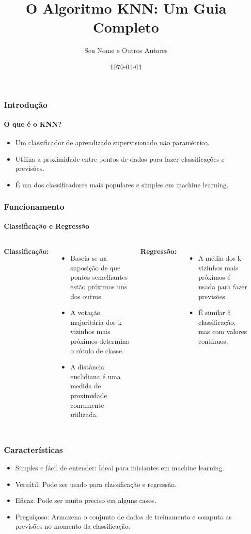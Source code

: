 \documentclass{beamer}
\title{O Algoritmo KNN: Um Guia Completo}
\author{Seu Nome e Outros Autores}
\date{\today}
\begin{document}
\frame{\titlepage}

\begin{frame}
\frametitle{Introdução}
\framesubtitle{O que é o KNN?}
\begin{itemize}
    \item Um classificador de aprendizado supervisionado não paramétrico.
    \item Utiliza a proximidade entre pontos de dados para fazer classificações e previsões.
    \item É um dos classificadores mais populares e simples em machine learning.
\end{itemize}
\end{frame}

\begin{frame}
\frametitle{Funcionamento}
\framesubtitle{Classificação e Regressão}
\begin{columns}
\textbf{Classificação:}
\begin{itemize}
    \item Baseia-se na suposição de que pontos semelhantes estão próximos uns dos outros.
    \item A votação majoritária dos k vizinhos mais próximos determina o rótulo de classe.
    \item A distância euclidiana é uma medida de proximidade comumente utilizada.
\end{itemize}
\textbf{Regressão:}
\begin{itemize}
    \item A média dos k vizinhos mais próximos é usada para fazer previsões.
    \item É similar à classificação, mas com valores contínuos.
\end{itemize}
\end{columns}
\end{frame}

\begin{frame}
\frametitle{Características}
\begin{itemize}
    \item Simples e fácil de entender: Ideal para iniciantes em machine learning.
    \item Versátil: Pode ser usado para classificação e regressão.
    \item Eficaz: Pode ser muito preciso em alguns casos.
    \item Preguiçoso: Armazena o conjunto de dados de treinamento e computa as previsões no momento da classificação.
\end{itemize}
\end{frame}
\end{document}
